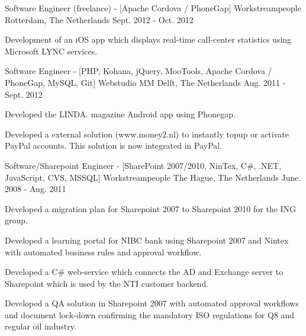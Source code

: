 \begin{cventries}
  \cventry
    {Software Engineer (freelance) - [Apache Cordova / PhoneGap]} %
    {Workstreampeople} %
    {Rotterdam, The Netherlands} %
    {Sept. 2012 - Oct. 2012} %
    {
      \begin{cvitems} %
        \item {Development of an iOS app which displays real-time call-center statistics using Microsoft LYNC services.}
      \end{cvitems}
    }

  \cventry
    {Software Engineer - [PHP, Kohana, jQuery, MooTools, Apache Cordova / PhoneGap, MySQL, Git]} %
    {Webstudio MM} %
    {Delft, The Netherlands} %
    {Aug. 2011 - Sept. 2012} %
    {
      \begin{cvitems} %
        \item {Developed the LINDA. magazine Android app using Phonegap.}
        \item {Developed a external solution (www.money2.nl) to instantly topup or activate PayPal accounts. This solution is now integrated in PayPal.}
      \end{cvitems}
    }

  \cventry
    {Software/Sharepoint Engineer - [SharePoint 2007/2010, NinTex, C\#, .NET, JavaScript, CVS, MSSQL]} %
    {Workstreampeople} %
    {The Hague, The Netherlands} %
    {June. 2008 - Aug. 2011} %
    {
      \begin{cvitems} %
        \item {Developed a migration plan for Sharepoint 2007 to Sharepoint 2010 for the ING group.}
        \item {Developed a learning portal for NIBC bank using Sharepoint 2007 and Nintex with automated business rules and approval workflow.}
        \item {Developed a C\# web-service which connects the AD and Exchange server to Sharepoint which is used by the NTI customer backend.}
        \item {Developed a QA solution in Sharepoint 2007 with automated approval workflows and document lock-down confirming the mandatory ISO regulations for Q8 and regular oil industry.}
      \end{cvitems}
    }

\end{cventries}
\vspace{20 mm}
